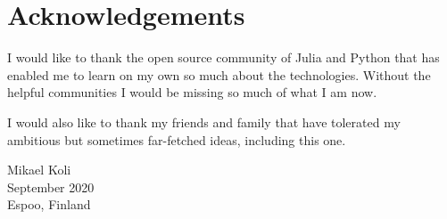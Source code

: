 \section*{Acknowledgements}

I would like to thank the open source community of Julia and Python
that has enabled me to learn on my own so much about the technologies.
Without the helpful communities I would be missing so much of what
I am now.

I would also like to thank my friends and family that have tolerated
my ambitious but sometimes far-fetched ideas, including this one.

Mikael Koli\\
September 2020\\ %
Espoo, Finland\\
